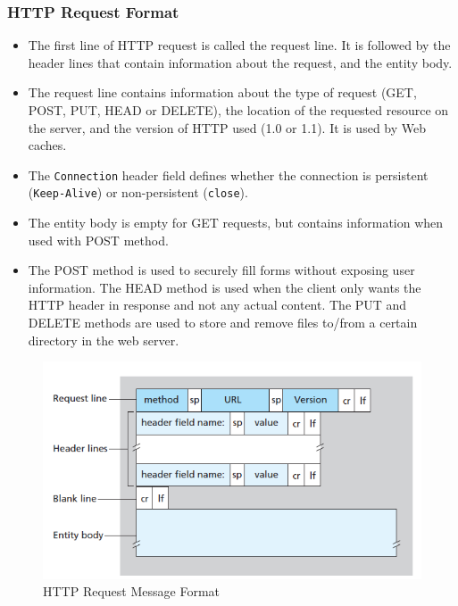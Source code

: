 \documentclass{article}
\theoremstyle{plain}
\theoremstyle{definition}
\begin{document}
\subsubsection{HTTP Request Format}
\begin{itemize}
    \item The first line of HTTP request is called the request line. It is followed by the header lines that contain information about the request, and the entity body.
    
    \item The request line contains information about the type of request (GET, POST, PUT, HEAD or DELETE), the location of the requested resource on the server, and the version of HTTP used (1.0 or 1.1). It is used by Web caches.
    
    \item The \texttt{Connection} header field defines whether the connection is persistent (\texttt{Keep-Alive}) or non-persistent (\texttt{close}). 
    
    \item The entity body is empty for GET requests, but contains information when used with POST method. 
    
    \item The POST method is used to securely fill forms without exposing user information. The HEAD method is used when the client only wants the HTTP header in response and not any actual content. The PUT and DELETE methods are used to store and remove files to/from a certain directory in the web server.
\end{itemize}
\begin{figure}[!h]
    \centering
    \includegraphics[scale=0.8]{cn4.png}
    \caption{HTTP Request Message Format}
    \label{fig:my_label_4}
\end{figure}
\end{document}
